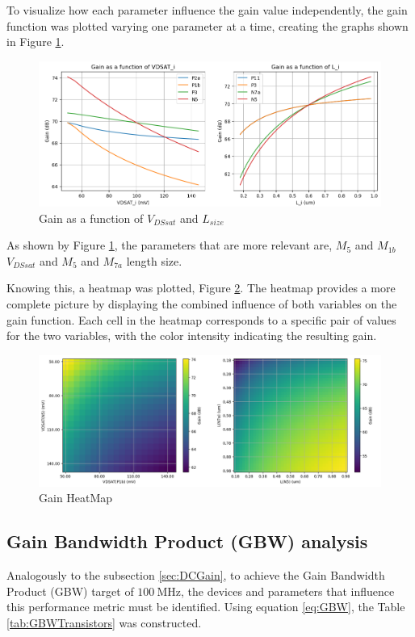 To visualize how each parameter influence the gain value independently, the gain function was plotted varying one parameter at a time, creating the graphs shown in Figure \ref{fig:GainVariation}. 

\begin{figure}[H]
    \centering
    \includegraphics[width=1\textwidth]{Images/GainVariation.png}
    \caption{Gain as a function of $V_{DSsat}$ and $L_{size}$}
    \label{fig:GainVariation}
\end{figure}

As shown by Figure \ref{fig:GainVariation}, the parameters that are more relevant are, $M_{5}$ and $M_{1b}$ $V_{DSsat}$ and $M_{5}$ and $M_{7a}$ length size.

Knowing this, a heatmap was plotted, Figure \ref{fig:GainHeatMap}. The heatmap provides a more complete picture by displaying the combined influence of both variables on the gain function. Each cell in the heatmap corresponds to a specific pair of values for the two variables, with the color intensity indicating the resulting gain.

\begin{figure}[H]
    \centering
    \includegraphics[width=1\textwidth]{Images/GainHeatMap.png}
    \caption{Gain HeatMap}
    \label{fig:GainHeatMap}
\end{figure}

\pagebreak
\subsection{Gain Bandwidth Product (GBW) analysis}
\label{sec:GBWPython}
Analogously to the subsection \ref{sec:DCGain}, to achieve the Gain Bandwidth Product (GBW) target of $\SI{100}{\mega\hertz}$, the devices and parameters that influence this performance metric must be identified. Using equation \ref{eq:GBW}, the Table \ref{tab:GBWTransistors} was constructed.

